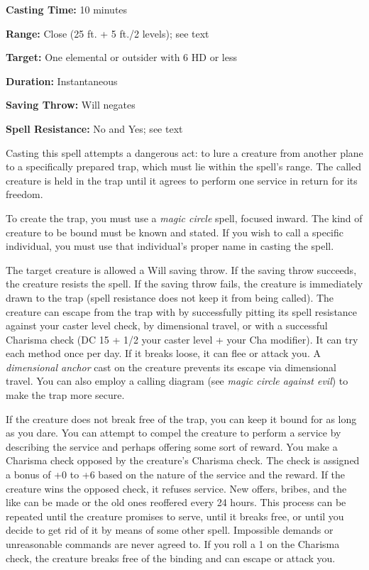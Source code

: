 \documentclass{article}
\begin{document}
\textbf{Casting Time:} 10 minutes

\textbf{Range:} Close (25 ft. + 5 ft./2 levels); see text

\textbf{Target:} One elemental or outsider with 6 HD or less

\textbf{Duration:} Instantaneous

\textbf{Saving Throw: }Will negates

\textbf{Spell Resistance:} No and Yes; see text

Casting this spell attempts a dangerous act: to lure a creature from another plane 
to a specifically prepared trap, which must lie within the spell's range. The called 
creature is held in the trap until it agrees to perform one service in return for 
its freedom.

To create the trap, you must use a \textit{magic circle }spell, focused inward. 
The kind of creature to be bound must be known and stated. If you wish to call 
a specific individual, you must use that individual's proper name in casting the 
spell.

The target creature is allowed a Will saving throw. If the saving throw succeeds, 
the creature resists the spell. If the saving throw fails, the creature is immediately 
drawn to the trap (spell resistance does not keep it from being called). The creature 
can escape from the trap with by successfully pitting its spell resistance against 
your caster level check, by dimensional travel, or with a successful Charisma check 
(DC 15 + 1/2 your caster level + your Cha modifier). It can try each method once 
per day. If it breaks loose, it can flee or attack you. A \textit{dimensional anchor 
}cast on the creature prevents its escape via dimensional travel. You can also 
employ a calling diagram (see \textit{magic circle against evil}) to make the trap 
more secure.

If the creature does not break free of the trap, you can keep it bound for as long 
as you dare. You can attempt to compel the creature to perform a service by describing 
the service and perhaps offering some sort of reward. You make a Charisma check 
opposed by the creature's Charisma check. The check is assigned a bonus of +0 to 
+6 based on the nature of the service and the reward. If the creature wins the 
opposed check, it refuses service. New offers, bribes, and the like can be made 
or the old ones reoffered every 24 hours. This process can be repeated until the 
creature promises to serve, until it breaks free, or until you decide to get rid 
of it by means of some other spell. Impossible demands or unreasonable commands 
are never agreed to. If you roll a 1 on the Charisma check, the creature breaks 
free of the binding and can escape or attack you.
\end{document}
